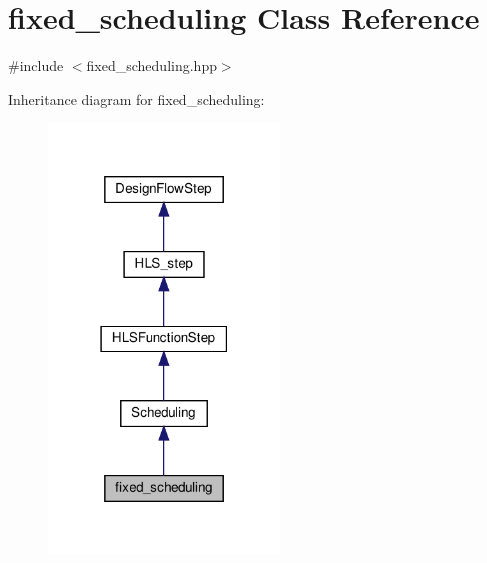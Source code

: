 \hypertarget{classfixed__scheduling}{}\section{fixed\+\_\+scheduling Class Reference}
\label{classfixed__scheduling}


{\ttfamily \#include $<$fixed\+\_\+scheduling.\+hpp$>$}



Inheritance diagram for fixed\+\_\+scheduling\+:
\nopagebreak
\begin{figure}[H]
\begin{center}
\leavevmode
\includegraphics[width=174pt]{de/d75/classfixed__scheduling__inherit__graph}
\end{center}
\end{figure}


